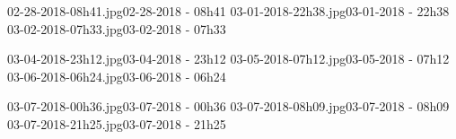 ﻿\documentclass[letterpaper, 12pt, landscape]{ProgressBook}
\begin{document}
{02-28-2018-08h41.jpg}{02-28-2018 - 08h41}
{03-01-2018-22h38.jpg}{03-01-2018 - 22h38}
{03-02-2018-07h33.jpg}{03-02-2018 - 07h33}

{03-04-2018-23h12.jpg}{03-04-2018 - 23h12}
{03-05-2018-07h12.jpg}{03-05-2018 - 07h12}
{03-06-2018-06h24.jpg}{03-06-2018 - 06h24}

{03-07-2018-00h36.jpg}{03-07-2018 - 00h36}
{03-07-2018-08h09.jpg}{03-07-2018 - 08h09}
{03-07-2018-21h25.jpg}{03-07-2018 - 21h25}
\end{document}
